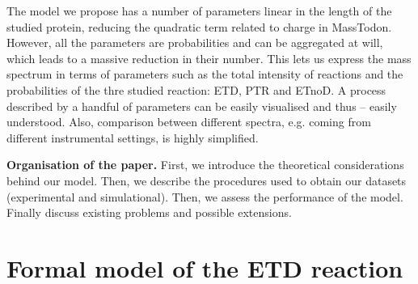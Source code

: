 \documentclass{llncs}
\begin{document}
The model we propose has a number of parameters linear in the length of the studied protein, reducing the quadratic term related to charge in {\sc MassTodon}. However, all the parameters are probabilities and can be aggregated at will, which leads to a massive reduction in their number. This lets us express the mass spectrum in terms of parameters such as the total intensity of reactions and the probabilities of the thre studied reaction: ETD, PTR and ETnoD. A process described by a handful of parameters can be easily visualised and thus -- easily understood. Also, comparison between different spectra, e.g. coming from different instrumental settings, is highly simplified.

\textbf{Organisation of the paper.}
First, we introduce the theoretical considerations behind our model. Then, we describe the procedures used to obtain our datasets (experimental and simulational). Then, we assess the performance of the model. Finally discuss existing problems and possible extensions.


\section{Formal model of the ETD reaction}
\end{document}
